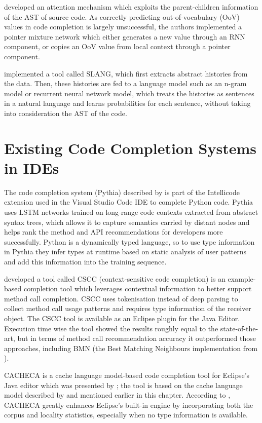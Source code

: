 \cite{Li17a} developed an attention mechanism which exploits the parent-children information of the AST of source code. As correctly predicting out-of-vocabulary (OoV) values in code completion is largely unsuccessful, the authors implemented a pointer mixture network which either generates a new value through an RNN component, or copies an OoV value from local context through a pointer component.

\cite{Rayc14a} implemented a tool called SLANG, which first extracts abstract histories from the data. Then, these histories are fed to a language model such as an n-gram model or recurrent neural network model, which treats the histories as sentences in a natural language and learns probabilities for each sentence, without taking into consideration the AST of the code.

\section{Existing Code Completion Systems in IDEs}
\label{sec:RelatedWorks-ExistingSystems}
The code completion system (Pythia) described by \cite{Svya19a} is part of the Intellicode extension used in the Visual Studio Code IDE to complete Python code. Pythia uses LSTM networks trained on long-range code contexts extracted from abstract syntax trees, which allows it to capture semantics carried by distant nodes and helps rank the method and API recommendations for developers more successfully. Python is a dynamically typed language, so to use type information in Pythia they infer types at runtime based on static analysis of user patterns and add this information into the training sequence.

\cite{Asad14a} developed a tool called CSCC (context-sensitive code completion) is an example-based completion tool which leverages contextual information to better support method call completion. CSCC uses tokenisation instead of deep parsing to collect method call usage patterns and requires type information of the receiver object. The CSCC tool is available as an Eclipse plugin for the Java Editor. Execution time wise the tool showed the results roughly equal to the state-of-the-art, but in terms of method call recommendation accuracy it outperformed those approaches, including BMN (the Best Matching Neighbours implementation from \cite{Bruc09a}).

CACHECA is a cache language model-based code completion tool for Eclipse's Java editor which was presented by \cite{Fran15a}; the tool is based on the cache language model described by \cite{Tu14a} and mentioned earlier in this chapter. According to \cite{Fran15a}, CACHECA greatly enhances Eclipse's built-in engine by incorporating both the corpus and locality statistics, especially when no type information is available.

